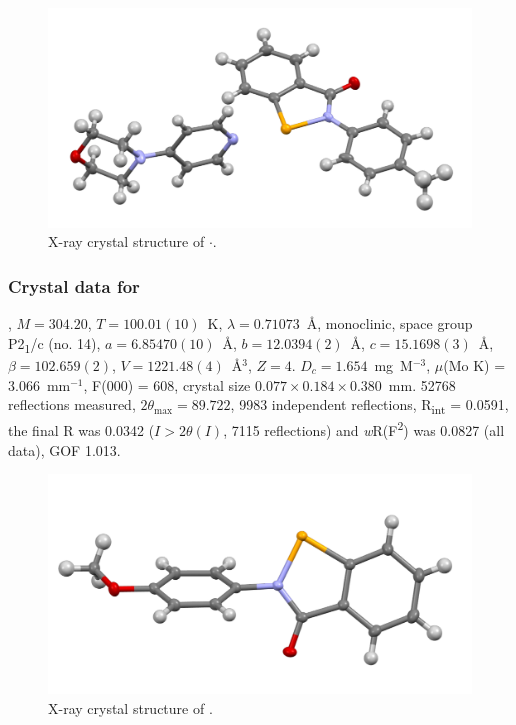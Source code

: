 \begin{refsection}
\begin{figure}
  \includegraphics[width=0.6\linewidth]{Figures/ebs-4me-morph-xtal.pdf}
  \caption{X-ray crystal structure of \texorpdfstring{$ \cdot $}{C23 H23 N3 O2 Se}.}
\end{figure}

\subsubsection{Crystal data for \texorpdfstring{}{C14 H11 N O2 Se}}
, $M=304.20$, $T=100.01(10)$~K, $ \lambda=0.71073 $~\AA, monoclinic, space group P2\textsubscript{1}/c (no. 14), $a = 6.85470(10)$~\AA, $b = 12.0394(2)$~\AA, $c = 15.1698(3)$~\AA, $\beta = 102.659(2)$\degree, $V = 1221.48(4)$~\AA$^{3}$, $Z = 4$. $D_{c}= 1.654$~mg~M$^{-3}$, $\mu$(Mo K\a) = 3.066~mm$^{-1}$, F(000) = 608, crystal size $0.077 \times 0.184 \times 0.380$~mm. 52768 reflections measured, $2\theta_{\max}=89.722$\degree, 9983 independent reflections, R\textsubscript{int} = 0.0591, the final R was 0.0342 ($I > 2\theta(I)$, 7115 reflections) and \textit{w}R(F\textsuperscript{2}) was 0.0827 (all data), GOF 1.013.

\begin{figure}
  \includegraphics[width=0.6\linewidth]{Figures/ebs-4ome-xtal.pdf}
  \caption{X-ray crystal structure of \texorpdfstring{}{C14 H11 N O2 Se}.}
\end{figure}


\end{refsection}
